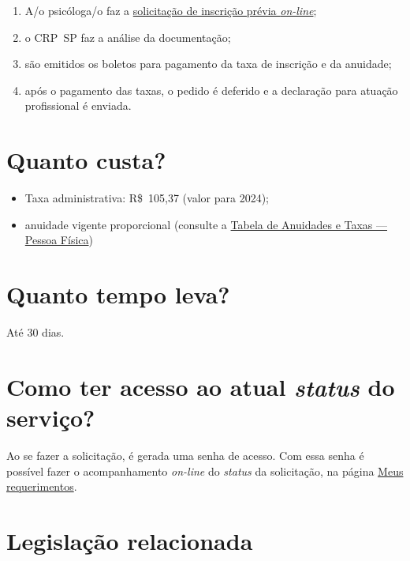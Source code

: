 \begin{enumerate}
  \item  A/o psicóloga/o faz a  \href{https://www.crpsp.org/pagina/view/314}{solicitação de inscrição  prévia \emph{on-line}};
  \item  o CRP~SP faz a análise da documentação;
  \item  são emitidos os boletos para pagamento da taxa de inscrição e da  anuidade;
  \item  após o pagamento das taxas, o pedido é deferido e a declaração para  atuação profissional é enviada.
\end{enumerate}

\section{Quanto custa?}

\begin{itemize}
  \item  Taxa administrativa: R\$~105,37 (valor para 2024);
  \item  anuidade vigente proporcional (consulte a  \href{https://www.crpsp.org/pagina/view/206}{Tabela de Anuidades e  Taxas --- Pessoa Física})
\end{itemize}

\section{Quanto tempo leva?}

Até 30 dias.

\section{Como ter acesso ao atual \emph{status} do serviço?}

Ao se fazer a solicitação, é gerada uma senha de acesso. Com essa senha é possível fazer o acompanhamento \emph{on-line} do \emph{status} da solicitação, na página \href{https://cfpsp.brctotal.com/crp06_servicosonline/pgsRequerimento/Requerimentos.aspx}{Meus requerimentos}.

\section{Legislação relacionada}

